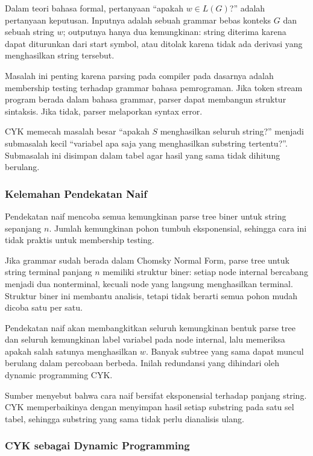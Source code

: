 Dalam teori bahasa formal, pertanyaan ``apakah $w\in L(G)$?'' adalah pertanyaan keputusan. Inputnya adalah sebuah grammar bebas konteks $G$ dan sebuah string $w$; outputnya hanya dua kemungkinan: string diterima karena dapat diturunkan dari start symbol, atau ditolak karena tidak ada derivasi yang menghasilkan string tersebut.

Masalah ini penting karena parsing pada compiler pada dasarnya adalah membership testing terhadap grammar bahasa pemrograman. Jika token stream program berada dalam bahasa grammar, parser dapat membangun struktur sintaksis. Jika tidak, parser melaporkan syntax error.

CYK memecah masalah besar ``apakah $S$ menghasilkan seluruh string?'' menjadi submasalah kecil ``variabel apa saja yang menghasilkan substring tertentu?''. Submasalah ini disimpan dalam tabel agar hasil yang sama tidak dihitung berulang.

\subsubsection{Kelemahan Pendekatan Naif}

\begin{jawab}
Pendekatan naif mencoba semua kemungkinan parse tree biner untuk string sepanjang $n$. Jumlah kemungkinan pohon tumbuh eksponensial, sehingga cara ini tidak praktis untuk membership testing.
\end{jawab}

Jika grammar sudah berada dalam Chomsky Normal Form, parse tree untuk string terminal panjang $n$ memiliki struktur biner: setiap node internal bercabang menjadi dua nonterminal, kecuali node yang langsung menghasilkan terminal. Struktur biner ini membantu analisis, tetapi tidak berarti semua pohon mudah dicoba satu per satu.

Pendekatan naif akan membangkitkan seluruh kemungkinan bentuk parse tree dan seluruh kemungkinan label variabel pada node internal, lalu memeriksa apakah salah satunya menghasilkan $w$. Banyak subtree yang sama dapat muncul berulang dalam percobaan berbeda. Inilah redundansi yang dihindari oleh dynamic programming CYK.

Sumber menyebut bahwa cara naif bersifat eksponensial terhadap panjang string. CYK memperbaikinya dengan menyimpan hasil setiap substring pada satu sel tabel, sehingga substring yang sama tidak perlu dianalisis ulang.

\subsubsection{CYK sebagai Dynamic Programming}

